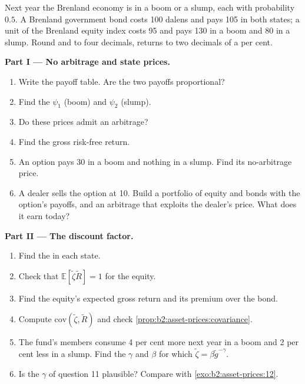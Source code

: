 \begin{problem}
\label{pb:b2:asset-prices:1}
Next year the Brenland economy is in a boom or a slump, each with probability $0.5$. A Brenland
government bond costs 100 dalens and pays 105 in both states; a unit of the Brenland equity index costs
95 and pays 130 in a boom and 80 in a slump. Round  and  to four decimals,
returns to two decimals of a per cent.

\medskip
\noindent\textbf{Part I --- No arbitrage and state prices.}
\begin{enumerate}
  \item Write the payoff table. Are the two payoffs proportional?
  \item Find the  $\psi_1$ (boom) and $\psi_2$ (slump).
  \item Do these prices admit an arbitrage?
  \item Find the gross risk-free return.
  \item An option pays 30 in a boom and nothing in a slump. Find its no-arbitrage price.
  \item A dealer sells the option at 10. Build a portfolio of equity and bonds with the option's
        payoffs, and an arbitrage that exploits the dealer's price. What does it earn today?
\end{enumerate}

\medskip
\noindent\textbf{Part II --- The discount factor.}
\begin{enumerate}[resume]
  \item Find the  in each state.
  \item Check that $\mathbb{E}[\tilde\zeta\tilde R] = 1$ for the equity.
  \item Find the equity's expected gross return and its premium over the bond.
  \item Compute $\mathrm{cov}(\tilde\zeta, \tilde R)$ and check \cref{prop:b2:asset-prices:covariance}.
  \item The fund's members consume 4 per cent more next year in a boom and 2 per cent less in a slump.
        Find the $\gamma$ and $\beta$ for which $\tilde\zeta = \beta\tilde g^{-\gamma}$.
  \item Is the $\gamma$ of question 11 plausible? Compare with \cref{exo:b2:asset-prices:12}.
\end{enumerate}


\end{problem}
